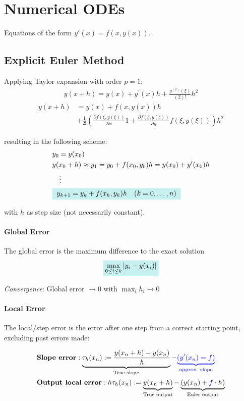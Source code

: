 \section{Numerical ODEs}

Equations of the form \colorbox{shadecolor}{$y'(x)=f(x,y(x))$.}

\subsection{Explicit Euler Method}

Applying Taylor expansion with order $p=1$:
\begin{align*}
    y(x+h)=y(x)+y^{\prime}(x)h+{\frac{y^{(2)}(\xi)}{(2)!}}h^{2}
\end{align*}
\begin{align*}
    y(x+h) & = y(x)+f(x,y(x))h \\
    & + {\frac{1}{2!}}\left(
    \frac{\partial{f}(\xi,y(\xi))}{\partial x}1 + \frac{\partial f(\xi,y(\xi))}{\partial y}f(\xi,y(\xi))
    \right)h^{2}
\end{align*}

resulting in the following scheme:
\begin{align*}
    & y_0 = y(x_0) \\
    & y(x_0 + h) \approx y_1 = y_0 + f(x_0,y_0)h=y(x_0)+y'(x_0)h \\
    &\quad\vdots \\
    & \colorbox{shadecolor}{
        $y_{k+1} = y_k+f(x_k,y_k)h\quad(k=0,\ldots,n)$
    }
\end{align*}

with $h$ as step size (not necessarily constant).

\paragraph{Global Error} The global error is the maximum difference to the exact solution
\begin{align*}
    \colorbox{shadecolor}{$\displaystyle\max_{0\leq i\leq k}|y_i-y(x_i)|$}
\end{align*}

\emph{Convergence}: Global error $\to 0\text{ with }\max_i h_i\to 0$

\paragraph{Local Error} The local/step error is the error after one step from a correct starting point,
excluding past errors made:
\begin{snugshade*}
    \begin{align*}
        & \textbf{Slope error} : \underbrace{\tau_h(x_n) := \frac{y(x_n + h) - y(x_n)}{h}}_\text{True slope} -
            {\color{blue} \underbrace{(y'(x_n)=f)}_\text{approx. slope}} \\
        & \textbf{Output local error} : h\tau_h(x_n) := \underbrace{y(x_n+h)}_\text{True output} -
        \underbrace{(y(x_n)+{\color{blue}f}\cdot h)}_\text{Euler output}
    \end{align*}
\end{snugshade*}


